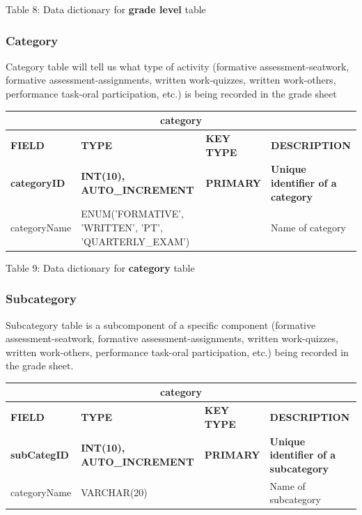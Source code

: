 \documentclass[11pt,a4paper,titlepage]{article}
\begin{document}
\vspace{.5cm}
\begin{center}
    Table 8: Data dictionary for \textbf{grade level} table
\end{center}

\newpage

\subsubsection{Category}

Category table will tell us what type of activity (formative assessment-seatwork, formative assessment-assignments, written work-quizzes, written work-others, performance task-oral participation, etc.) is being recorded in the grade sheet

\vspace{1cm}
\begin{longtable}{ |p{2.5cm}|p{4.5cm}|p{2.5cm}|p{3cm}|  }
    \hline
    \multicolumn{4}{|c|}{\textbf{category}} \\
    \hline
    \textbf{FIELD}&\textbf{TYPE}&\textbf{KEY TYPE}&\textbf{DESCRIPTION}\\
    \hline
    \textbf{categoryID}  & \textbf{INT(10), AUTO\_INCREMENT} & \textbf{PRIMARY} & \textbf{Unique identifier of a category}\\ \hline
    categoryName & ENUM('FORMATIVE', 'WRITTEN', 'PT', 'QUARTERLY\_EXAM') & & Name of category \\ \hline
\end{longtable}

\vspace{.5cm}
\begin{center}
    Table 9: Data dictionary for \textbf{category} table
\end{center}

\newpage

\subsubsection{Subcategory}

Subcategory table is a subcomponent of a specific component (formative assessment-seatwork, formative assessment-assignments, written work-quizzes, written work-others, performance task-oral participation, etc.) being recorded in the grade sheet.

\vspace{1cm}
\begin{longtable}{ |p{2.5cm}|p{4.5cm}|p{2.5cm}|p{3cm}|  }
    \hline
    \multicolumn{4}{|c|}{\textbf{category}} \\
    \hline
    \textbf{FIELD}&\textbf{TYPE}&\textbf{KEY TYPE}&\textbf{DESCRIPTION}\\
    \hline
    \textbf{subCategID}  & \textbf{INT(10), AUTO\_INCREMENT} & \textbf{PRIMARY} & \textbf{Unique identifier of a subcategory}\\ \hline
    categoryName & VARCHAR(20) & & Name of subcategory \\ \hline
\end{longtable}
\end{document}
